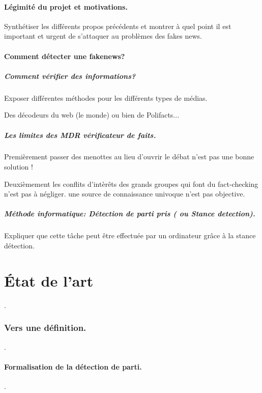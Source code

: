 \documentclass[onecolumn, 12pt]{article}
\begin{document}
  \subsection{Légimité du projet et motivations.}
    Synthétiser les différents propos précédents et montrer à quel point il est
    important et urgent de s'attaquer au problèmes des fakes news.

  \subsection{Comment détecter une fakenews?}

    \subsubsection{Comment vérifier des informations?}
    Exposer différentes méthodes pour les différents types de médias.

    Des décodeurs du web (le monde) ou bien de Polifacts...
    \subsubsection{Les limites des MDR vérificateur de faits.}
    Premièrement passer des menottes au lieu d'ouvrir le débat n'est pas une
    bonne solution !

    Deuxièmement les conflits d'intèrêts des grands groupes qui font du
    fact-checking n'est pas à négliger. une source de connaissance univoque
    n'est pas objective.
    \subsubsection{Méthode informatique: Détection de parti pris
    ( ou Stance detection).}
    Expliquer que cette tâche peut être effectuée par un ordinateur grâce à la
    stance détection.

\part{État de l'art}
.
\section{Vers une définition.}
.
  \subsection{Formalisation de la détection de parti.}
.
\end{document}
